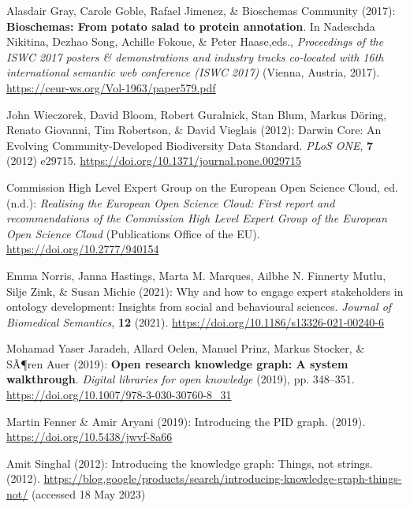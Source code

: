 \begin{thebibliography}{9}
Alasdair Gray, Carole Goble, Rafael Jimenez, \& Bioschemas Community
(2017): \textbf{Bioschemas: From potato salad to protein annotation}. In
Nadeschda Nikitina, Dezhao Song, Achille Fokoue, \& Peter Haase,eds.,
\emph{Proceedings of the ISWC 2017 posters \& demonstrations and
industry tracks co-located with 16th international semantic web
conference (ISWC 2017)} (Vienna, Austria, 2017).
\url{https://ceur-ws.org/Vol-1963/paper579.pdf}

John Wieczorek, David Bloom, Robert Guralnick, Stan Blum, Markus Döring,
Renato Giovanni, Tim Robertson, \& David Vieglais (2012): Darwin {Core}:
{An Evolving Community-Developed Biodiversity Data Standard}. \emph{PLoS
ONE}, \textbf{7} (2012) e29715.
\url{https://doi.org/10.1371/journal.pone.0029715}

Commission High Level Expert Group on the European Open Science Cloud,
ed. (n.d.): \emph{Realising the {European Open Science Cloud}: First
report and recommendations of the {Commission High Level Expert Group}
of the {European Open Science Cloud}} ({Publications Office of the EU}).
\url{https://doi.org/10.2777/940154}

Emma Norris, Janna Hastings, Marta M. Marques, Ailbhe N. Finnerty Mutlu,
Silje Zink, \& Susan Michie (2021): Why and how to engage expert
stakeholders in ontology development: Insights from social and
behavioural sciences. \emph{Journal of Biomedical Semantics},
\textbf{12} (2021).
\url{https://doi.org/10.1186/s13326-021-00240-6}

Mohamad Yaser Jaradeh, Allard Oelen, Manuel Prinz, Markus Stocker, \&
SÃ¶ren Auer (2019): \textbf{Open research knowledge graph: A system
walkthrough}. \emph{Digital libraries for open knowledge} (2019), pp.
348--351.
\url{https://doi.org/10.1007/978-3-030-30760-8_31}

Martin Fenner \& Amir Aryani (2019): Introducing the PID graph. (2019).
\url{https://doi.org/10.5438/jwvf-8a66}

Amit Singhal (2012): Introducing the knowledge graph: Things, not
strings. (2012).
\url{https://blog.google/products/search/introducing-knowledge-graph-things-not/}
(accessed 18 May 2023)


\end{thebibliography}
